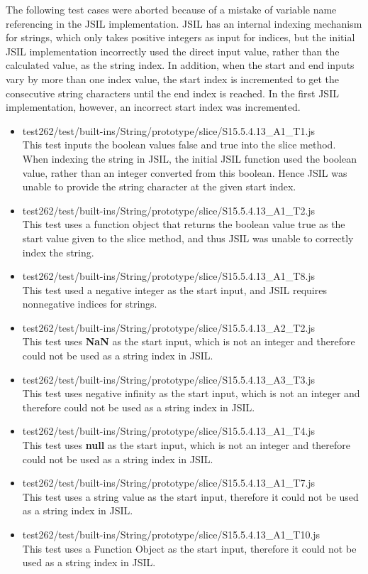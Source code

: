 \documentclass[a4paper,11pt,twoside]{report}
\begin{document}
\begin{itemize}
The following test cases were aborted because of a mistake of variable name referencing in the JSIL implementation. JSIL has an internal indexing mechanism for strings, which only takes positive integers as input for indices, but the initial JSIL implementation incorrectly used the direct input value, rather than the calculated value, as the string index. In addition, when the start and end inputs vary by more than one index value, the start index is incremented to get the consecutive string characters until the end index is reached. In the first JSIL implementation, however, an incorrect start index was incremented.
\begin{itemize}
\item test262/test/built-ins/String/prototype/slice/S15.5.4.13\_A1\_T1.js \\
This test inputs the boolean values false and true into the slice method. When indexing the string in JSIL, the initial JSIL function used the boolean value, rather than an integer converted from this boolean. Hence JSIL was unable to provide the string character at the given start index.
\item test262/test/built-ins/String/prototype/slice/S15.5.4.13\_A1\_T2.js \\
This test uses a function object that returns the boolean value true as the start value given to the slice method, and thus JSIL was unable to correctly index the string.
\item test262/test/built-ins/String/prototype/slice/S15.5.4.13\_A1\_T8.js \\
This test used a negative integer as the start input, and JSIL requires nonnegative indices for strings.
\item test262/test/built-ins/String/prototype/slice/S15.5.4.13\_A2\_T2.js \\
This test uses \textbf{NaN} as the start input, which is not an integer and therefore could not be used as a string index in JSIL.
\item test262/test/built-ins/String/prototype/slice/S15.5.4.13\_A3\_T3.js \\
This test uses negative infinity as the start input, which is not an integer and therefore could not be used as a string index in JSIL.
\item test262/test/built-ins/String/prototype/slice/S15.5.4.13\_A1\_T4.js \\
This test uses \textbf{null} as the start input, which is not an integer and therefore could not be used as a string index in JSIL.
\item test262/test/built-ins/String/prototype/slice/S15.5.4.13\_A1\_T7.js \\
This test uses a string value as the start input, therefore it could not be used as a string index in JSIL.
\item test262/test/built-ins/String/prototype/slice/S15.5.4.13\_A1\_T10.js \\
This test uses a Function Object as the start input, therefore it could not be used as a string index in JSIL.
\end{itemize}


\end{itemize}
\end{document}
